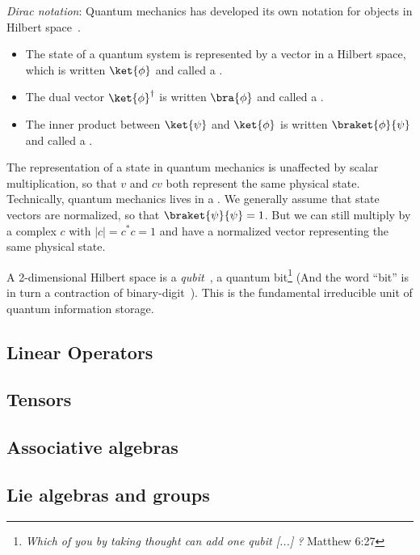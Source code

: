 {\sl Dirac notation}: Quantum mechanics has developed its own notation for objects in Hilbert space~\cite{Dirac???}. 
 \begin{itemize}
 \item The state of a quantum system is represented by a vector in a Hilbert space, which is written $\ket{\phi}$ and called a .
  \item The dual vector $\ket{\phi}^\dagger$  is written $\bra{\phi}$ and called a .
  \item The inner product between $\ket{\psi}$ and $\ket{\phi}$ is written $\braket{\phi}{\psi}$ and called a .
 \end{itemize}
The representation of a state in quantum mechanics is unaffected by scalar multiplication, so that $v$ and $cv$ both represent the same physical state. Technically, quantum mechanics  lives in a . We generally assume that state vectors are normalized, so that $\braket{\psi}{\psi}=1$. But we can still multiply by a complex  $c$ with $|c| = c^*c = 1$ and have a  normalized vector representing the same physical state.  

A 2-dimensional Hilbert space is a {\sl qubit}~\cite{???}, a quantum bit\footnote{{\sl
Which of you by taking thought can add one qubit [...] ?} Matthew 6:27} (And the word ``bit'' is in turn a contraction of binary-digit~\cite{???}). This is the fundamental irreducible unit of quantum information storage.


\subsection{Linear Operators}


\subsection{Tensors}


\subsection{Associative algebras}



\subsection{Lie algebras and groups}



